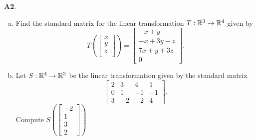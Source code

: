 \documentclass{article}
\newenvironment{problem}[1]
{
  \begin{flushleft}
  \textbf{#1}.
  \ignorespaces
}
{
  \end{flushleft}
}
\begin{document}
\begin{problem}{A2}
\begin{enumerate}[(a)]
\item Find the standard matrix for the linear transformation \(T: \mathbb{R}^3\rightarrow \mathbb{R}^4\) given by \[T\left(\begin{bmatrix} x \\ y \\ z \\  \end{bmatrix} \right) = \begin{bmatrix} -x+y \\ -x+3y-z \\ 7x+y+3z \\ 0 \end{bmatrix}.\]
\item Let \(S: \mathbb{R}^4 \rightarrow \mathbb{R}^3\) be the linear transformation given by the standard matrix \[\begin{bmatrix} 2 & 3 & 4 & 1 \\ 0 & 1 & -1 & -1 \\ 3 & -2 & -2 & 4 \end{bmatrix}.\]
Compute  \( S\left( \begin{bmatrix} -2 \\ 1 \\ 3 \\ 2\end{bmatrix} \right) \)
\end{enumerate}
\end{problem}
\end{document}
